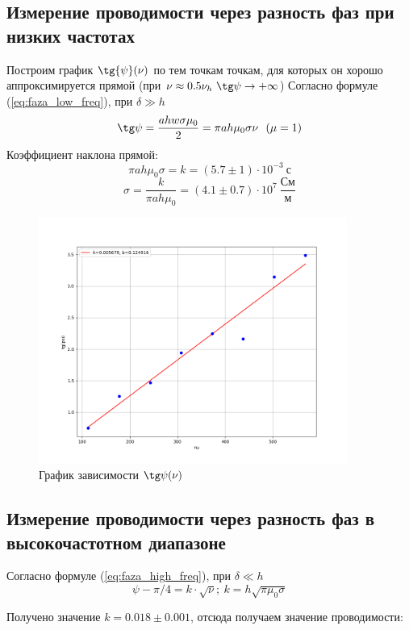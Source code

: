 \documentclass[a4paper, 12pt]{article}
\begin{document}
	\subsection*{Измерение проводимости через разность фаз при низких частотах}
	Построим график $\tg{\psi} (\nu)$ по тем точкам точкам, для которых он хорошо аппроксимируется прямой (при $\nu \approx 0.5 \nu_h \ \tg \psi \rightarrow +\infty$) 
	Согласно формуле (\ref{eq:faza_low_freq}), при $\delta \gg h$
	\begin{equation*}
		\tg \psi = \frac{ahw \sigma \mu_0}{2} = \pi ah\mu_0\sigma \nu \ \ (\mu = 1)
	\end{equation*}
	Коэффициент наклона прямой: \[\pi ah \mu_0\sigma = k = (5.7 \pm 1) \cdot 10^{-3} \ \text{с}\]
	\[\sigma = \frac{k}{\pi ah \mu_0} = (4.1 \pm 0.7) \cdot 10^7 \ \frac{\text{См}}{\text{м}}\]
	\begin{figure}[H]
		\centering
		\includegraphics[width=0.9\textwidth, height = 0.45\textheight]{data/data3}
		\caption{График зависимости $\tg \psi (\nu)$}\label{fig:tg_psi_nu_line}
	\end{figure}

	\subsection*{Измерение проводимости через разность фаз в высокочастотном диапазоне}
	Согласно формуле (\ref{eq:faza_high_freq}), при $\delta \ll h$
	\begin{equation*}
		\psi - \pi/4 = k\cdot \sqrt{\nu}; \ k = h\sqrt{\pi\mu_0\sigma}
	\end{equation*}
	
	Получено значение $k = 0.018 \pm 0.001$, отсюда получаем значение проводимости:
	
\end{document}
